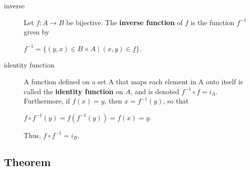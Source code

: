 \documentclass[12pt]{article}
\begin{document}
\begin{description}
\item[{inverse}] Let \(f:A\longrightarrow{}B\) be bijective. The \textbf{inverse function} of
\(f\) is the function \(f^{-1}\) given by
\begin{center}
\(f^{-1}=\{(y,x)\in{}B\times{}A\mid(x,y)\in{}f\}\).
\end{center}
\item[{identity function}] A function defined on a set A that maps each element in A
onto itself is called the \textbf{identity function} on \(A\), and is denoted
\(f^{-1}\circ{}f=i_{A}\). Furthermore, if \(f(x)=y\), then \(x=f^{-1}(y)\), so that
\begin{center}
\(f\circ{}f^{-1}(y)=f(f^{-1}(y))=f(x)=y\).
\end{center}
Thus, \(f\circ{}f^{-1}=i_{B}\).
\end{description}
\subsection{Theorem}
\label{sec:orge4665bd}
\end{document}
